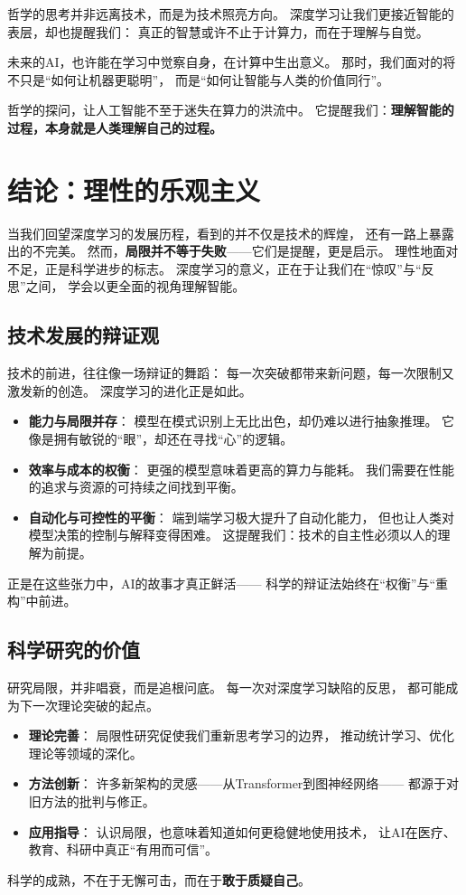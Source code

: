 哲学的思考并非远离技术，而是为技术照亮方向。  
深度学习让我们更接近智能的表层，却也提醒我们：  
真正的智慧或许不止于计算力，而在于理解与自觉。  

未来的AI，也许能在学习中觉察自身，在计算中生出意义。  
那时，我们面对的将不只是“如何让机器更聪明”，  
而是“如何让智能与人类的价值同行”。  

哲学的探问，让人工智能不至于迷失在算力的洪流中。  
它提醒我们：\textbf{理解智能的过程，本身就是人类理解自己的过程。}

\section{结论：理性的乐观主义}

当我们回望深度学习的发展历程，看到的并不仅是技术的辉煌，  
还有一路上暴露出的不完美。  
然而，\textbf{局限并不等于失败}——它们是提醒，更是启示。  
理性地面对不足，正是科学进步的标志。  
深度学习的意义，正在于让我们在“惊叹”与“反思”之间，  
学会以更全面的视角理解智能。

\subsection{技术发展的辩证观}  
技术的前进，往往像一场辩证的舞蹈：  
每一次突破都带来新问题，每一次限制又激发新的创造。  
深度学习的进化正是如此。  
\begin{itemize}
\item \textbf{能力与局限并存}：  
  模型在模式识别上无比出色，却仍难以进行抽象推理。  
  它像是拥有敏锐的“眼”，却还在寻找“心”的逻辑。  

\item \textbf{效率与成本的权衡}：  
  更强的模型意味着更高的算力与能耗。  
  我们需要在性能的追求与资源的可持续之间找到平衡。  

\item \textbf{自动化与可控性的平衡}：  
  端到端学习极大提升了自动化能力，  
  但也让人类对模型决策的控制与解释变得困难。  
  这提醒我们：技术的自主性必须以人的理解为前提。  
\end{itemize}
正是在这些张力中，AI的故事才真正鲜活——  
科学的辩证法始终在“权衡”与“重构”中前进。

\subsection{科学研究的价值}  
研究局限，并非唱衰，而是追根问底。  
每一次对深度学习缺陷的反思，  
都可能成为下一次理论突破的起点。  
\begin{itemize}
\item \textbf{理论完善}：  
  局限性研究促使我们重新思考学习的边界，  
  推动统计学习、优化理论等领域的深化。  
\item \textbf{方法创新}：  
  许多新架构的灵感——从Transformer到图神经网络——  
  都源于对旧方法的批判与修正。  
\item \textbf{应用指导}：  
  认识局限，也意味着知道如何更稳健地使用技术，  
  让AI在医疗、教育、科研中真正“有用而可信”。  
\end{itemize}
科学的成熟，不在于无懈可击，而在于\textbf{敢于质疑自己}。  

